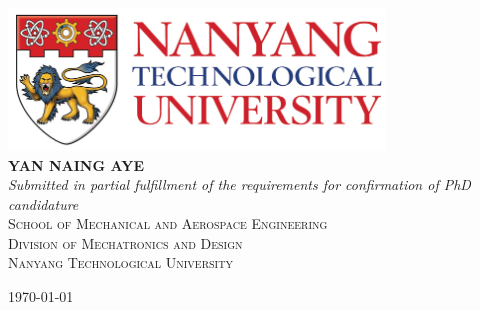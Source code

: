 \begin{titlepage}

\begin{center}
{\LARGE  \bfseries \titleSentence}\\[1cm]

\includegraphics[width=10cm]{./Fig/ntu_logo.jpg}\\[1cm]    

{\Large \bfseries YAN NAING AYE}\\[2cm]

\emph{\Large Submitted in partial fulfillment of the requirements for confirmation of PhD candidature}\\[4cm]

\textsc{\large 
School of Mechanical and Aerospace Engineering\\
Division of Mechatronics and Design\\
Nanyang Technological University}\\[1cm]
\vfill

{\large \mydate\today}

\end{center}
\end{titlepage}
